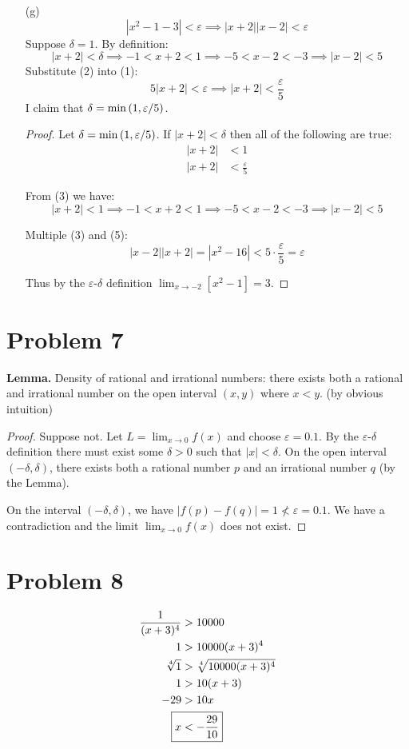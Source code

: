 \documentclass{article}
\newcommand*{\paren}[1]{\ensuremath\left(#1\right)}
\newcommand*{\problem}[1]{\section*{Problem #1}}
\newcommand*{\limit}[2][x]{\ensuremath{\displaystyle\lim_{#1\to#2}}}
\newcommand*{\Limit}[3][x]{\ensuremath{\displaystyle\lim_{#1\to#2}\left[#3\right]}}
\newcommand*{\abs}[1]{\ensuremath{\left|#1\right|}}
\newcommand*{\eps}{\varepsilon}
\begin{document}
\begin{itemize}
	\begin{proof}
		Let $\delta=\sqrt{\eps}$.
		\begin{gather*}
			\abs{x-2}<\delta
			\implies\abs{(x-2)^2}<\delta^2
			\implies\abs{x^2-4x+4}<\eps
			\implies\abs{x^2-4x+5-1}<\eps
		\end{gather*}
	\end{proof}

	\item[(g)]
	\begin{equation*}
		\abs{x^2-1-3}<\eps
		\implies\abs{x+2}\abs{x-2}<\eps \tag{1}
	\end{equation*}
	Suppose $\delta=1$. By definition:
	\begin{equation*}
		|x+2|<\delta
		\implies-1<x+2<1
		\implies-5<x-2<-3
		\implies\abs{x-2}<5 \tag{2}
	\end{equation*}
	Substitute (2) into (1):
	\begin{equation*}
		5\abs{x+2}<\eps
		\implies\abs{x+2}<\frac{\eps}{5}
	\end{equation*}
	I claim that $\delta=\min\paren{1,\eps/5}$.
	\begin{proof}
		Let $\delta=\min\paren{1,\eps/5}$. If $\abs{x+2}<\delta$ then all of the following are true:
		\begin{align*}
			\abs{x+2}&<1 \tag{3} \\
			\abs{x+2}&<\frac{\eps}{5} \tag{4}
		\end{align*}

		From (3) we have:
		\begin{equation*}
			\abs{x+2}<1
			\implies-1<x+2<1
			\implies-5<x-2<-3
			\implies\abs{x-2}<5 \tag{5}
		\end{equation*}

		Multiple (3) and (5):
		\begin{equation*}
			\abs{x-2}\abs{x+2}=\abs{x^2-16}<5\cdot\frac{\eps}{5}=\eps
		\end{equation*}

		Thus by the $\eps$-$\delta$ definition $\Limit{-2}{x^2-1}=3$.
	\end{proof}

\end{itemize}

\problem{7}
\textbf{Lemma.} Density of rational and irrational numbers: there exists both a rational and irrational number on the open interval $(x,y)$ where $x<y$. (by obvious intuition)

\begin{proof}
	Suppose not. Let $L=\limit{0}f(x)$ and choose $\eps=0.1$. By the $\eps$-$\delta$ definition there must exist some $\delta>0$ such that $|x|<\delta$. On the open interval $(-\delta,\delta)$, there exists both a rational number $p$ and an irrational number $q$ (by the Lemma).
	
	On the interval $(-\delta,\delta)$, we have $\abs{f(p)-f(q)}=1\not<\eps=0.1$. We have a contradiction and the limit $\limit{0}f(x)$ does not exist.
\end{proof}

\problem{8}
\begin{align*}
	\frac{1}{(x+3)^4}&>10000 \\
	1&>10000(x+3)^4 \\
	\sqrt[4]{1}&>\sqrt[4]{10000(x+3)^4} \\
	1&>10(x+3) \\
	-29&>10x \\
	\Aboxed{x&<-\frac{29}{10}}
\end{align*}
\end{document}
